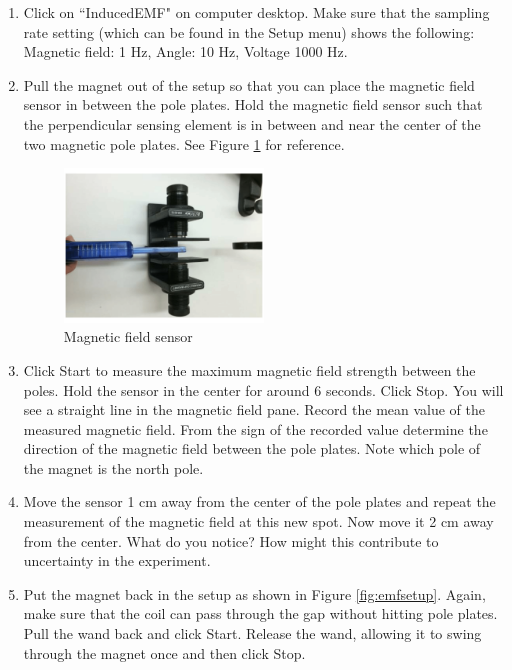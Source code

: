 \begin{enumerate}
 \item Click on ``InducedEMF" on computer desktop. Make sure that the sampling rate setting (which can be found in the Setup menu) shows the following: Magnetic field: 1 Hz, Angle: 10 Hz, Voltage 1000 Hz.

 \item Pull the magnet out of the setup so that you can place the magnetic field sensor in between the pole plates. Hold the magnetic field sensor such that the perpendicular sensing element is in between and near the center of the two magnetic pole plates. See Figure \ref{fig:mag_measure} for reference.

 \begin{figure}[h]
 \centering
 \includegraphics[width=0.5\textwidth]{./Exp4/pic/mag_measure.png}
 \caption{Magnetic field sensor}
 \label{fig:mag_measure}
 \end{figure}

 \item Click Start to measure the maximum magnetic field strength between the poles. Hold the sensor in the center for around 6 seconds. Click Stop. You will see a straight line in the magnetic field pane. Record the mean value of the measured magnetic field. From the sign of the recorded value determine the direction of the magnetic field between the pole plates. Note which pole of the magnet is the north pole.

 \item Move the sensor 1 cm away from the center of the pole plates and repeat the measurement of the magnetic field at this new spot. Now move it 2 cm away from the center. What do you notice? How might this contribute to uncertainty in the experiment.

 \item Put the magnet back in the setup as shown in Figure \ref{fig:emfsetup}. Again, make sure that the coil can pass through the gap without hitting pole plates. Pull the wand back and click Start. Release the wand, allowing it to swing through the magnet once and then click Stop.


\end{enumerate}
